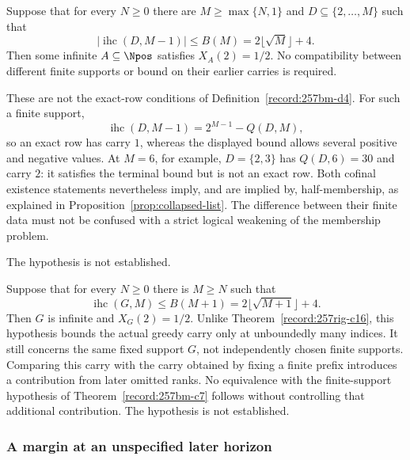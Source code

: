 \begin{thm}\label{record:257rig-c17}
Suppose that for every $N\ge0$ there are $M\ge\max\{N,1\}$ and
$D\subseteq\{2,\ldots,M\}$ such that
\[
 |\operatorname{ihc}(D,M-1)|\le B(M)
       =2\lfloor\sqrt M\rfloor+4.
\]
Then some infinite $A\subseteq\Npos$ satisfies $X_A(2)=1/2$.
No compatibility between different finite supports or bound on their
earlier carries is required.

These are not the exact-row conditions of
Definition~\ref{record:257bm-d4}.  For such a finite support,
\[
 \operatorname{ihc}(D,M-1)=2^{M-1}-Q(D,M),
\]
so an exact row has carry $1$, whereas the displayed bound allows
several positive and negative values.  At $M=6$, for example,
$D=\{2,3\}$ has $Q(D,6)=30$ and carry $2$: it satisfies the
terminal bound but is not an exact row.
Both cofinal existence statements nevertheless imply, and are
implied by, half-membership, as explained in
Proposition~\ref{prop:collapsed-list}.  The difference between their
finite data must not be confused with a strict logical weakening
of the membership problem.
\end{thm}
The hypothesis is not established.

\begin{thm}\label{record:257rig-c18}
Suppose that for every $N\ge0$ there is $M\ge N$ such that
\[
 \operatorname{ihc}(G,M)\le B(M+1)
       =2\lfloor\sqrt{M+1}\rfloor+4.
\]
Then $G$ is infinite and $X_G(2)=1/2$.  Unlike
Theorem~\ref{record:257rig-c16}, this hypothesis bounds the actual greedy
carry only at unboundedly many indices.  It still concerns the same fixed
support $G$, not independently chosen finite supports.
Comparing this carry with the carry obtained by fixing a finite prefix introduces a contribution from later omitted ranks. No equivalence with the finite-support hypothesis
of Theorem~\ref{record:257bm-c7} follows without controlling that
additional contribution. The hypothesis is not established.
\end{thm}

\subsubsection*{A margin at an unspecified later horizon}

